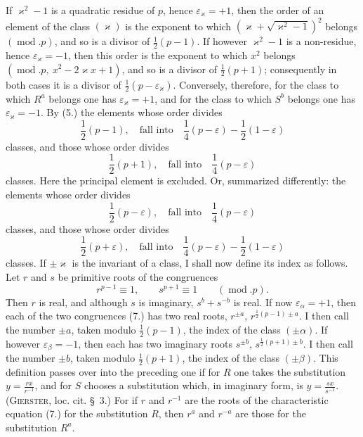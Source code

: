 \documentclass[11pt]{article}
\begin{document}
If $\varkappa^2-1$ is a quadratic residue of $p$, hence $\varepsilon_\varkappa=+1$, then the order of an element of the class $(\varkappa)$ is the exponent to which $(\varkappa+\sqrt{\varkappa^2-1})^2$ belongs $(\operatorname{mod}.p)$, and so is a divisor of $\frac12(p-1)$. If however $\varkappa^2-1$ is a non-residue, hence $\varepsilon_\varkappa=-1$, then this order is the exponent to which $x^2$ belongs $(\operatorname{mod}.p,\ x^2-2\varkappa x+1)$, and so is a divisor of $\frac12(p+1)$; consequently in both cases it is a divisor of $\frac12(p-\varepsilon_\varkappa)$. Conversely, therefore, for the class to which $R^a$ belongs one has $\varepsilon_\varkappa=+1$, and for the class to which $S^b$ belongs one has $\varepsilon_\varkappa=-1$. By (5.) the elements whose order divides
\begin{equation*}\tag{11.}
\frac12(p-1),\quad \text{fall into}\quad \frac14(p-\varepsilon)-\frac12(1-\varepsilon)
\end{equation*}
classes, and those whose order divides
\begin{equation*}\tag{12.}
\frac12(p+1),\quad \text{fall into}\quad \frac14(p-\varepsilon)
\end{equation*}
classes. Here the principal element is excluded. Or, summarized differently: the elements whose order divides
\begin{equation*}\tag{13.}
\frac12(p-\varepsilon),\quad \text{fall into}\quad \frac14(p-\varepsilon)
\end{equation*}
classes, and those whose order divides
\begin{equation*}\tag{14.}
\frac12(p+\varepsilon),\quad \text{fall into}\quad \frac14(p-\varepsilon)-\frac12(1-\varepsilon)
\end{equation*}
classes. If $\pm\varkappa$ is the invariant of a class, I shall now define its index as follows. Let $r$ and $s$ be primitive roots of the congruences
\begin{equation*}\tag{15.}
r^{p-1}\equiv1,\qquad s^{p+1}\equiv1\qquad(\operatorname{mod}.p).
\end{equation*}
Then $r$ is real, and although $s$ is imaginary, $s^b+s^{-b}$ is real. If now $\varepsilon_\alpha=+1$, then each of the two congruences (7.) has two real roots, $r^{\pm a}$, $r^{\frac12(p-1)\pm a}$. I then call the number $\pm a$, taken modulo $\frac12(p-1)$, the index of the class $(\pm\alpha)$. If however $\varepsilon_\beta=-1$, then each has two imaginary roots $s^{\pm b}$, $s^{\frac12(p+1)\pm b}$. I then call the number $\pm b$, taken modulo $\frac12(p+1)$, the index of the class $(\pm\beta)$. This definition passes over into the preceding one if for $R$ one takes the substitution $y=\frac{rx}{r^{-1}}$, and for $S$ chooses a substitution which, in imaginary form, is $y=\frac{sx}{s^{-1}}$. (\textsc{Gierster}, loc. cit. \S~3.) For if $r$ and $r^{-1}$ are the roots of the characteristic equation (7.) for the substitution $R$, then $r^a$ and $r^{-a}$ are those for the substitution $R^a$.
\end{document}
